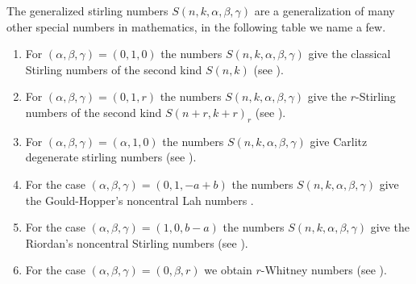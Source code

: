 \documentclass[12pt]{amsart}
\newtheorem{proof 1}{proof 1}
\begin{document}
The generalized stirling numbers $S(n,k,\alpha,\beta,\gamma)$ are a generalization of many other special numbers in mathematics, in the following table we name a few. 
\begin{table}[!h]\caption{Some special cases of\label{equation:60} $S(n,k,\alpha,\beta,\gamma)$}\label{table:1}
\begin{enumerate}
	\item For  $(\alpha,\beta,\gamma)=(0,1,0)$ the numbers  $S(n,k,\alpha,\beta,\gamma)$ give the classical Stirling numbers of the second kind $S(n,k)$ (see \cite{comtet1974advanced}). 
	\item  For $(\alpha,\beta,\gamma)=(0,1,r)$ the numbers  $S(n,k,\alpha,\beta,\gamma)$ give the $r$-Stirling numbers of the second kind $S(n+r,k+r)_r$ (see \cite{broader}). 
	\item For $(\alpha,\beta,\gamma)=(\alpha,1,0)$ the numbers  $S(n,k,\alpha,\beta,\gamma)$ give Carlitz degenerate stirling numbers (see \cite{carlitz}). 
	\item For the case  $(\alpha,\beta,\gamma)=(0,1,-a+b)$ the numbers  $S(n,k,\alpha,\beta,\gamma)$ give the Gould-Hopper’s noncentral Lah numbers \cite{gouldhopper}.
	\item For the case $(\alpha,\beta,\gamma)=(1,0,b-a)$ the numbers  $S(n,k,\alpha,\beta,\gamma)$ give the Riordan’s noncentral Stirling numbers (see \cite{Riordan}).
	\item  For the case $(\alpha,\beta,\gamma)=(0,\beta,r)$ we obtain $r$-Whitney numbers (see \cite{whitney}).
	\end{enumerate}
\end{table}
\end{document}
